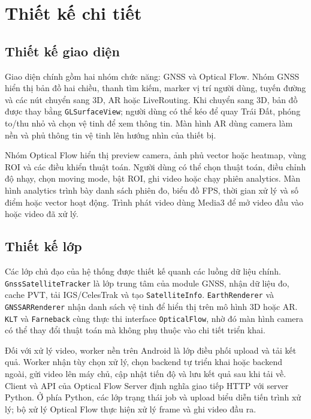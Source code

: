 \documentclass[../DoAn.tex]{subfiles}
\begin{document}
\FloatBarrier
\section{Thiết kế chi tiết}
\label{section:4.2}
\subsection{Thiết kế giao diện}
\label{subsection:4.2.1}
Giao diện chính gồm hai nhóm chức năng: GNSS và Optical Flow. Nhóm GNSS hiển thị bản đồ hai chiều, thanh tìm kiếm, marker vị trí người dùng, tuyến đường và các nút chuyển sang 3D, AR hoặc LiveRouting. Khi chuyển sang 3D, bản đồ được thay bằng \texttt{GLSurfaceView}; người dùng có thể kéo để quay Trái Đất, phóng to/thu nhỏ và chọn vệ tinh để xem thông tin. Màn hình AR dùng camera làm nền và phủ thông tin vệ tinh lên hướng nhìn của thiết bị.

Nhóm Optical Flow hiển thị preview camera, ảnh phủ vector hoặc heatmap, vùng ROI và các điều khiển thuật toán. Người dùng có thể chọn thuật toán, điều chỉnh độ nhạy, chọn moving mode, bật ROI, ghi video hoặc chạy phiên analytics. Màn hình analytics trình bày danh sách phiên đo, biểu đồ FPS, thời gian xử lý và số điểm hoặc vector hoạt động. Trình phát video dùng Media3 để mở video đầu vào hoặc video đã xử lý.

\subsection{Thiết kế lớp}
\label{subsection:4.2.2}
Các lớp chủ đạo của hệ thống được thiết kế quanh các luồng dữ liệu chính. \texttt{GnssSatelliteTracker} là lớp trung tâm của module GNSS, nhận dữ liệu đo, cache PVT, tải IGS/CelesTrak và tạo \texttt{SatelliteInfo}. \texttt{EarthRenderer} và \texttt{GNSSARRenderer} nhận danh sách vệ tinh để hiển thị trên mô hình 3D hoặc AR. \texttt{KLT} và \texttt{Farneback} cùng thực thi interface \texttt{OpticalFlow}, nhờ đó màn hình camera có thể thay đổi thuật toán mà không phụ thuộc vào chi tiết triển khai.

Đối với xử lý video, worker nền trên Android là lớp điều phối upload và tải kết quả. Worker nhận tùy chọn xử lý, chọn backend tự triển khai hoặc backend ngoài, gửi video lên máy chủ, cập nhật tiến độ và lưu kết quả sau khi tải về. Client và API của Optical Flow Server định nghĩa giao tiếp HTTP với server Python. Ở phía Python, các lớp trạng thái job và upload biểu diễn tiến trình xử lý; bộ xử lý Optical Flow thực hiện xử lý frame và ghi video đầu ra.
\end{document}
